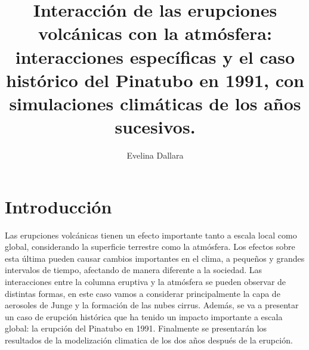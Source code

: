 \documentclass[a4apaper,twocolumn,10pt]{article}
\begin{document}
\title{Interacción de las erupciones
volcánicas con la atmósfera:
interacciones específicas y el caso hist\'orico del Pinatubo en 1991, con simulaciones clim\'aticas de los a\~nos sucesivos.}
\author{Evelina Dallara}
\date{}

\section{Introducción}
Las erupciones volc\'anicas tienen un efecto importante tanto a escala local como global,
considerando la superficie terrestre como la atm\'osfera. Los efectos sobre esta \'ultima pueden causar cambios importantes en el clima, a peque\~nos y grandes intervalos de tiempo, afectando de manera diferente a la sociedad. Las interacciones entre la columna eruptiva y la atm\'osfera se pueden observar de distintas formas, en este caso vamos a considerar principalmente la capa de aerosoles de Junge y la formaci\'on de las nubes cirrus. Además, se va a presentar un caso de erupci\'on hist\'orica que ha tenido un impacto importante a escala global: la erupci\'on del Pinatubo en 1991. Finalmente se presentar\'an los resultados de la modelizaci\'on climatica de los dos a\~nos despu\'es de la erupci\'on. 
\end{document}
